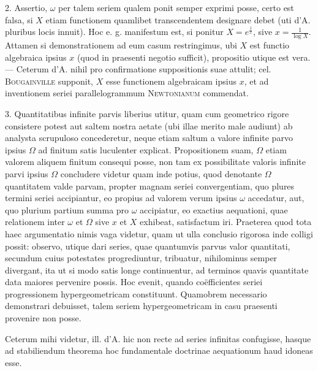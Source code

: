 2. Assertio, $\omega$ per talem seriem qualem ponit semper exprimi posse, certo
est falsa, si $X$ etiam functionem quamlibet transcendentem designare debet (uti
d'A. pluribus locis innuit). Hoc e. g. manifestum est, si ponitur $X=e^{\frac1x}$, sive
$x=\frac1{\log X}$. Attamen si demonstrationem ad eum casum restringimus, ubi $X$ est
functio algebraica ipsius $x$ (quod in praesenti negotio sufficit), propositio utique
est vera. --- Ceterum d'A. nihil pro confirmatione suppositionis suae attulit; cel.
\textsc{Bougainville} supponit, $X$ esse functionem algebraicam ipsius $x$, et ad inventionem seriei parallelogrammum \textsc{Newtonianum} commendat.

3. Quantitatibus infinite parvis liberius utitur, quam cum geometrico rigore consistere potest aut saltem nostra aetate (ubi illae merito male audiunt) ab
analysta scrupuloso concederetur, neque etiam saltum a valore infinite parvo ipsius $\Omega$ ad finitum satis luculenter explicat. Propositionem suam, $\Omega$ etiam valorem aliquem finitum consequi posse, non tam ex possibilitate valoris infinite
parvi ipsius $\Omega$ concludere videtur quam inde potius, quod denotante $\Omega$ quantitatem valde parvam, propter magnam seriei convergentiam, quo plures termini
seriei accipiantur, eo propius ad valorem verum ipsius $\omega$ accedatur, aut,
quo plurium partium summa pro $\omega$ accipiatur, eo exactius aequationi, quae relationem inter $\omega$ et $\Omega$ sive $x$ et $X$ exhibeat, satisfactum iri. Praeterea quod tota
haec argumentatio nimis vaga videtur, quam ut ulla conclusio rigorosa inde colligi possit: observo, utique dari series, quae quantumvis parvus valor quantitati,
secundum cuius potestates progrediuntur, tribuatur, nihilominus semper divergant, ita ut si modo satis longe continuentur, ad terminos quavis quantitate data
maiores pervenire possis. Hoc evenit, quando coëfficientes seriei progressionem
hypergeometricam constituunt. Quamobrem necessario demonstrari debuisset, talem seriem hypergeometricam in casu praesenti provenire non posse.

Ceterum mihi videtur, ill. d'A. hic non recte ad series infinitas confugisse,
hasque ad stabiliendum theorema hoc fundamentale doctrinae aequationum haud
idoneas esse.

